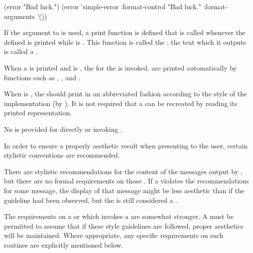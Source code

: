 (error "Bad luck.")
\EQ (error 'simple-error :format-control "Bad luck." :format-arguments '())
\endcode
{}

\endsubsubsection%

\endsubsection%
 
 
If the  argument to  is used,
a print function is defined that is called whenever 
the defined  is printed while  is . 
This function is called the ;
the text which it outputs is called a .

When a  is printed and 
is , the  for the  is invoked.
 are printed automatically by functions such as
, , and .

When  is , the  should print in an
abbreviated fashion according to the style of the implementation
(\eg by ).  It is not required that a
 can be recreated by reading its printed representation.
 
No  is provided for directly  
or invoking .
 

In order to ensure a properly aesthetic result when presenting
 to the user, certain stylistic conventions are
recommended.

There are stylistic recommendations for the content of the messages
output by , but there are no formal requirements 
on those .
If a  violates the recommendations for some message, the
display of that message might be less aesthetic than if the guideline
had been observed, but the  is still considered a
.

The requirements on a  or  which
invokes a  are somewhat stronger.  A  must be permitted to assume that if these style guidelines are
followed, proper aesthetics will be maintained.  Where appropriate, any
specific requirements on such routines are explicitly mentioned below.

